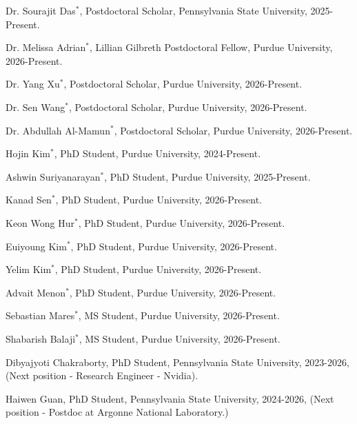 \documentclass[letterpaper]{article}
\renewenvironment{itemize}{
  \begin{list}{}{
    \setlength{\leftmargin}{1.5em}
  }
}{
  \end{list}
}
\begin{document}
\begin{itemize}

  \item Dr. Sourajit Das$^\ast$, Postdoctoral Scholar, Pennsylvania State University, 2025-Present.

  \item Dr. Melissa Adrian$^\ast$, Lillian Gilbreth Postdoctoral Fellow, Purdue University, 2026-Present.

  \item Dr. Yang Xu$^\ast$, Postdoctoral Scholar, Purdue University, 2026-Present.

  \item Dr. Sen Wang$^\ast$, Postdoctoral Scholar, Purdue University, 2026-Present.

  \item Dr. Abdullah Al-Mamun$^\ast$, Postdoctoral Scholar, Purdue University, 2026-Present.

  \item Hojin Kim$^\ast$, PhD Student, Purdue University, 2024-Present.

  \item Ashwin Suriyanarayan$^\ast$, PhD Student, Purdue University, 2025-Present.

  \item Kanad Sen$^\ast$, PhD Student, Purdue University, 2026-Present.

  \item Keon Wong Hur$^\ast$, PhD Student, Purdue University, 2026-Present.

  \item Euiyoung Kim$^\ast$, PhD Student, Purdue University, 2026-Present.

  \item Yelim Kim$^\ast$, PhD Student, Purdue University, 2026-Present.

  \item Advait Menon$^\ast$, PhD Student, Purdue University, 2026-Present.

  \item Sebastian Mares$^\ast$, MS Student, Purdue University, 2026-Present.

  \item Shabarish Balaji$^\ast$, MS Student, Purdue University, 2026-Present.

  \item Dibyajyoti Chakraborty, PhD Student, Pennsylvania State University, 2023-2026, (Next position - Research Engineer - Nvidia).

  \item Haiwen Guan, PhD Student, Pennsylvania State University, 2024-2026, (Next position - Postdoc at Argonne National Laboratory.)
  

\end{itemize}
\end{document}
